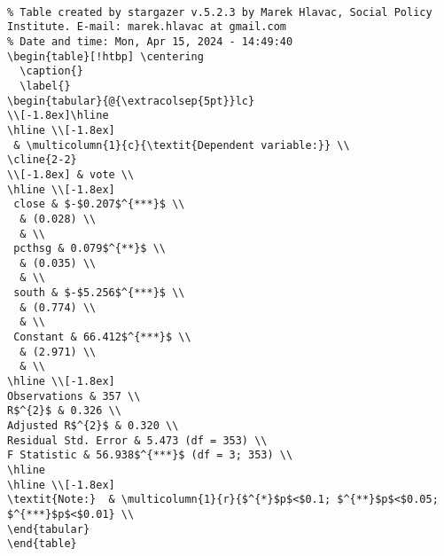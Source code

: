 \documentclass[
  letterpaper,
  DIV=11,
  numbers=noendperiod]{scrartcl}
\begin{document}
\begin{verbatim}

% Table created by stargazer v.5.2.3 by Marek Hlavac, Social Policy Institute. E-mail: marek.hlavac at gmail.com
% Date and time: Mon, Apr 15, 2024 - 14:49:40
\begin{table}[!htbp] \centering 
  \caption{} 
  \label{} 
\begin{tabular}{@{\extracolsep{5pt}}lc} 
\\[-1.8ex]\hline 
\hline \\[-1.8ex] 
 & \multicolumn{1}{c}{\textit{Dependent variable:}} \\ 
\cline{2-2} 
\\[-1.8ex] & vote \\ 
\hline \\[-1.8ex] 
 close & $-$0.207$^{***}$ \\ 
  & (0.028) \\ 
  & \\ 
 pcthsg & 0.079$^{**}$ \\ 
  & (0.035) \\ 
  & \\ 
 south & $-$5.256$^{***}$ \\ 
  & (0.774) \\ 
  & \\ 
 Constant & 66.412$^{***}$ \\ 
  & (2.971) \\ 
  & \\ 
\hline \\[-1.8ex] 
Observations & 357 \\ 
R$^{2}$ & 0.326 \\ 
Adjusted R$^{2}$ & 0.320 \\ 
Residual Std. Error & 5.473 (df = 353) \\ 
F Statistic & 56.938$^{***}$ (df = 3; 353) \\ 
\hline 
\hline \\[-1.8ex] 
\textit{Note:}  & \multicolumn{1}{r}{$^{*}$p$<$0.1; $^{**}$p$<$0.05; $^{***}$p$<$0.01} \\ 
\end{tabular} 
\end{table} 
\end{verbatim}
\end{document}
